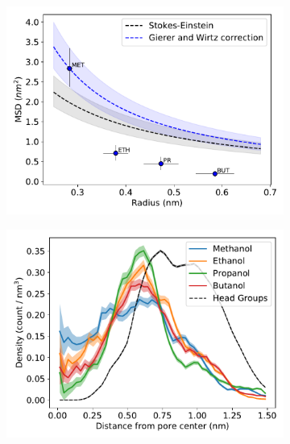 \documentclass{article}
\begin{document}
  \begin{figure}
  \centering
  \begin{subfigure}{0.45\textwidth}
  \includegraphics[width=\linewidth]{msd_radius_simple_alcohols_10wt.pdf}
  \caption{}\label{fig:msd_radius_simple_alcohol_rdf}
  \end{subfigure}
  \begin{subfigure}{0.45\textwidth}
  \includegraphics[width=\linewidth]{simple_alcohol_rdf.pdf}
  \caption{}\label{fig:simple_alcohol_rdf}
  \end{subfigure}
  \begin{subfigure}{0.45\textwidth}

\end{subfigure}
\end{figure}
\end{document}
